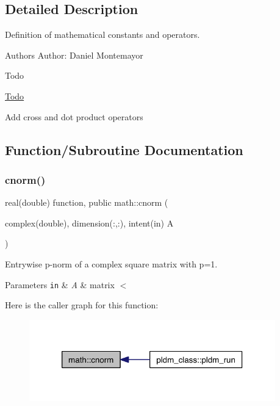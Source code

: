 \subsection{Detailed Description}
Definition of mathematical constants and operators. 

\begin{DoxyAuthor}{Authors}
Author\+: Daniel Montemayor 
\end{DoxyAuthor}
\begin{DoxyRefDesc}{Todo}
\item[\hyperlink{todo__todo000008}{Todo}]
\begin{DoxyItemize}
\item Add cross and dot product operators 
\end{DoxyItemize}\end{DoxyRefDesc}


\subsection{Function/\+Subroutine Documentation}
\mbox{\label{namespacemath_a864984937cf0f3b7bdbc9b652b84445d}} 
\subsubsection{\texorpdfstring{cnorm()}{cnorm()}}
{\footnotesize\ttfamily real(double) function, public math\+::cnorm (\begin{DoxyParamCaption}\item[{complex(double), dimension(\+:,\+:), intent(in)}]{A }\end{DoxyParamCaption})}



Entrywise p-\/norm of a complex square matrix with p=1. 


\begin{DoxyParams}[1]{Parameters}
\mbox{\tt in}  & {\em A} & matrix $<$ \\
\hline
\end{DoxyParams}
Here is the caller graph for this function\+:\nopagebreak
\begin{figure}[H]
\begin{center}
\leavevmode
\includegraphics[width=302pt]{namespacemath_a864984937cf0f3b7bdbc9b652b84445d_icgraph}
\end{center}
\end{figure}
\mbox{\label{namespacemath_a2830cb5393b6e6a8baa8d072c73ce8a9}} 
